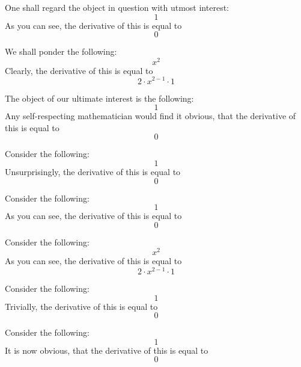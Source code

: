 \documentclass{article}
\begin{document}
One shall regard the object in question with utmost interest:
\begin{equation}
1 
\end{equation}
As you can see, the derivative of this is equal to
\begin{equation}
0 
\end{equation}

We shall ponder the following:
\begin{equation}
x ^{2 } 
\end{equation}
Clearly, the derivative of this is equal to
\begin{equation}
2 \cdot x ^{2 - 1 } \cdot 1 
\end{equation}

The object of our ultimate interest is the following:
\begin{equation}
1 
\end{equation}
Any self-respecting mathematician would find it obvious, that the derivative of this is equal to
\begin{equation}
0 
\end{equation}

Consider the following:
\begin{equation}
1 
\end{equation}
Unsurprisingly, the derivative of this is equal to
\begin{equation}
0 
\end{equation}

Consider the following:
\begin{equation}
1 
\end{equation}
As you can see, the derivative of this is equal to
\begin{equation}
0 
\end{equation}

Consider the following:
\begin{equation}
x ^{2 } 
\end{equation}
As you can see, the derivative of this is equal to
\begin{equation}
2 \cdot x ^{2 - 1 } \cdot 1 
\end{equation}

Consider the following:
\begin{equation}
1 
\end{equation}
Trivially, the derivative of this is equal to
\begin{equation}
0 
\end{equation}

Consider the following:
\begin{equation}
1 
\end{equation}
It is now obvious, that the derivative of this is equal to
\begin{equation}
0 
\end{equation}
\end{document}
